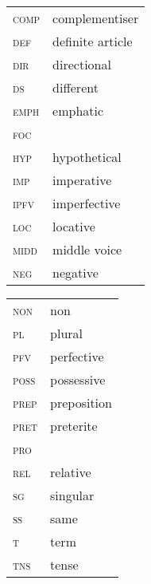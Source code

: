 \documentclass[output=paper
,newtxmath
,modfonts
,nonflat]{langsci/langscibook}
\begin{document}
\begin{tabularx}{.45\textwidth}{>{\scshape}lQ}
comp & complementiser\\
 def & definite article\\
 dir & directional\\
 ds & different \\
 emph & emphatic \\
 foc & \\
 hyp & hypothetical\\
 imp & imperative\\
 ipfv & imperfective\\ 
 loc & locative\\
 midd & middle voice\\
 neg & negative\\
\end{tabularx}
\begin{tabularx}{.45\textwidth}{>{\scshape}lQ}
 non & non\\
 pl & plural\\
 pfv & perfective\\
 poss & possessive \\
 prep & preposition\\
 pret & preterite\\
 pro & \\
 rel & relative\\
 sg & singular\\
 ss & same \\
 t & term\\
 tns & tense
\end{tabularx}









\sloppy
\printbibliography[heading=subbibliography,notkeyword=this]
\end{document}

